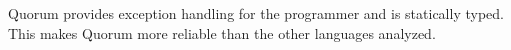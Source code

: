 Quorum provides exception handling for the programmer and is statically typed. This makes Quorum more reliable than the other languages analyzed. 

